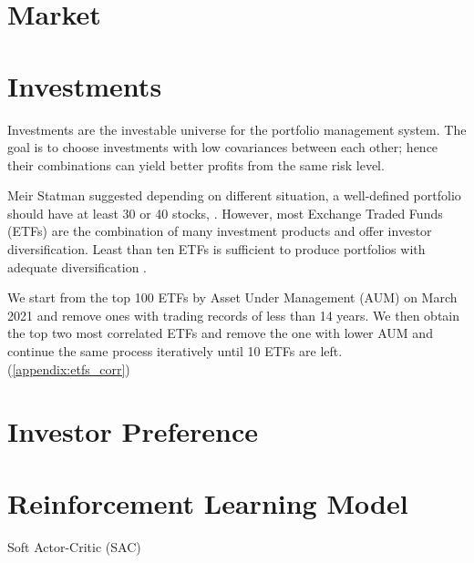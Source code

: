\section{Market}
\section{Investments}
Investments are the investable universe for the portfolio management system. The goal is to choose investments with low covariances between each other; hence their combinations can yield better profits from the same risk level\cite{willenbrock2011diversification}. 
\par 
Meir Statman suggested depending on different situation, a well-defined portfolio should have at least 30 or 40 stocks,  \cite{statman1987many}. However, most Exchange Traded Funds (ETFs) are the combination of many investment products and offer investor diversification. Least than ten ETFs is sufficient to produce portfolios with adequate diversification \cite{chang_2016}.
\par
We start from the top 100 ETFs by Asset Under Management (AUM) on March 2021 and remove ones with trading records of less than 14 years. We then obtain the top two most correlated ETFs and remove the one with lower AUM and continue the same process iteratively until 10 ETFs are left.  (\autoref{appendix:etfs_corr})
\par


\section{Investor Preference}
\section{Reinforcement Learning Model}
Soft Actor-Critic (SAC)\cite{haarnoja2018soft}